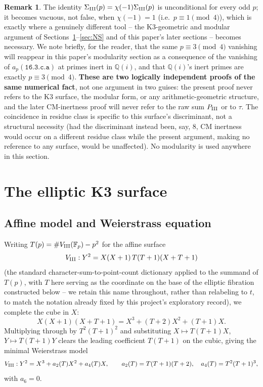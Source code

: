 \documentclass[11pt]{amsart}
\theoremstyle{definition}
\newtheorem{remark}[theorem]{Remark}
\newcommand{\Fp}{\mathbb{F}_p}
\newcommand{\Q}{\mathbb{Q}}
\begin{document}
\begin{remark}
\label{rem:involution-vs-CM}
The identity $\Sigma_{\rm III}(p)=\chi(-1)\Sigma_{\rm III}(p)$ is
unconditional for every odd $p$; it becomes vacuous, not false, when
$\chi(-1)=1$ (i.e.\ $p\equiv1\pmod4$), which is exactly where a genuinely
different tool -- the K3-geometric and modular argument of
Sections~\ref{sec:K3}--\ref{sec:NS} and of this paper's later sections --
becomes necessary. We note briefly, for the reader, that the same
$p\equiv3\pmod4$ vanishing will reappear in this paper's modularity
section as a consequence of the vanishing of $a_p(\texttt{16.3.c.a})$ at
primes inert in $\mathbb Q(i)$, and that $\Q(i)$'s inert primes are
exactly $p\equiv3\pmod4$. \textbf{These are two logically independent
proofs of the same numerical fact}, not one argument in two guises: the
present proof never refers to the K3 surface, the modular form, or any
arithmetic-geometric structure, and the later CM-inertness proof will
never refer to the raw sum $P_{\rm III}$ or to $\tau$. The coincidence in
residue class is specific to this surface's discriminant, not a
structural necessity (had the discriminant instead been, say, $8$, CM
inertness would occur on a different residue class while the present
argument, making no reference to any surface, would be unaffected). No
modularity is used anywhere in this section.
\end{remark}

\section{The elliptic K3 surface}
\label{sec:K3}

\subsection{Affine model and Weierstrass equation}

Writing $T(p) = \#V_{\rm III}(\Fp) - p^2$ for the affine surface
\[
V_{\rm III} : Y^2 = X(X+1)\,T(T+1)(X+T+1)
\]
(the standard character-sum-to-point-count dictionary applied to the
summand of $T(p)$, with $T$ here serving as the coordinate on the base of
the elliptic fibration constructed below -- we retain this name throughout,
rather than relabeling to $t$, to match the notation already fixed by
this project's exploratory record), we complete the cube in $X$:
\[
X(X+1)(X+T+1) = X^3+(T+2)X^2+(T+1)X.
\]
Multiplying through by $T^2(T+1)^2$ and substituting $X\mapsto T(T+1)X$,
$Y\mapsto T(T+1)Y$ clears the leading coefficient $T(T+1)$ on the cubic,
giving the minimal Weierstrass model
\[
V_{\rm III} : Y^2 = X^3 + a_2(T)X^2+a_4(T)X,\qquad
a_2(T)=T(T+1)(T+2),\quad a_4(T)=T^2(T+1)^3,
\]
with $a_6=0$.
\end{document}
